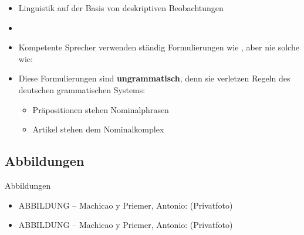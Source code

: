 \begin{frame}

\begin{itemize}
	
	\item Linguistik \ras auf der Basis von deskriptiven Beobachtungen
	\item[]
	\item Kompetente Sprecher verwenden ständig Formulierungen wie , aber nie solche wie:
	
	\z
	
	\z
	
	\z
	
	\medskip
	\item Diese Formulierungen sind \textbf{ungrammatisch}, denn sie verletzen Regeln des deutschen grammatischen Systems:
	\begin{itemize}
		\item Präpositionen stehen  Nominalphrasen
		\item Artikel stehen  dem Nominalkomplex
	\end{itemize}	
	
\end{itemize}

\end{frame}


\subsection{Abbildungen}


\begin{frame}{Abbildungen}
\small

\begin{itemize}
	\item ABBILDUNG -- Machicao y Priemer, Antonio:  (Privatfoto)
	\item ABBILDUNG -- Machicao y Priemer, Antonio:  (Privatfoto)
\end{itemize}	

\end{frame}

